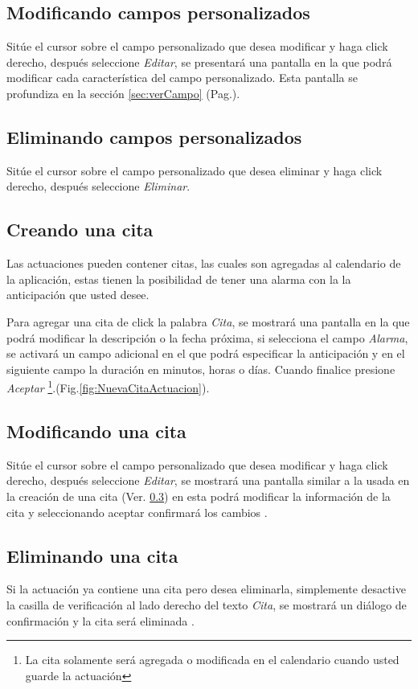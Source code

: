 \subsection{Modificando campos personalizados}
\label{sec:modificarCamposActuacion}
Sit\'ue el cursor sobre el campo personalizado que desea modificar y haga click derecho, despu\'es seleccione \emph{Editar},
se presentar\'a una pantalla en la que podr\'a modificar cada caracter\'istica
del campo personalizado. Esta pantalla se profundiza en la secci\'on
\ref{sec:verCampo} (Pag.\pageref{sec:verCampo}).

\subsection{Eliminando campos personalizados}
\label{sec:eliminarCamposActuacion}
Sit\'ue el cursor sobre el campo personalizado que desea eliminar y haga click derecho, despu\'es seleccione \emph{Eliminar}.

\subsection{Creando una cita}
\label{sec:crearCita}
Las actuaciones pueden contener citas, las cuales son agregadas al calendario de la aplicaci\'on, estas tienen la posibilidad de tener una alarma
con la la anticipaci\'on que usted desee.

Para agregar una cita de click la palabra \emph{Cita}, se mostrar\'a una
pantalla en la que podr\'a modificar la descripci\'on o la fecha pr\'oxima,
si selecciona el campo \emph{Alarma}, se activar\'a un campo adicional en el
que podr\'a especificar la anticipaci\'on y en el siguiente campo la duraci\'on
en minutos, horas o d\'ias. Cuando finalice presione \emph{Aceptar}
\footnote{La cita solamente ser\'a agregada o modificada en el calendario cuando
usted guarde la actuaci\'on}.(Fig.\ref{fig:NuevaCitaActuacion}). 
  

\subsection{Modificando una cita}
\label{sec:modificarCita}
Sit\'ue el cursor sobre el campo personalizado que desea modificar y haga click derecho, despu\'es seleccione \emph{Editar}, se
mostrar\'a una pantalla similar a la usada en la creaci\'on de una cita (Ver.
\ref{sec:crearCita}) en esta podr\'a modificar la informaci\'on de la cita
y seleccionando aceptar confirmar\'a los cambios
\footnotemark[\value{footnote}].

\subsection{Eliminando una cita}
\label{sec:eliminarCita}
Si la actuaci\'on ya contiene una cita pero desea eliminarla, simplemente desactive la casilla de verificaci\'on al lado derecho del texto \emph{Cita}, se mostrar\'a
un di\'alogo de confirmaci\'on y la cita ser\'a eliminada
\footnotemark[\value{footnote}].